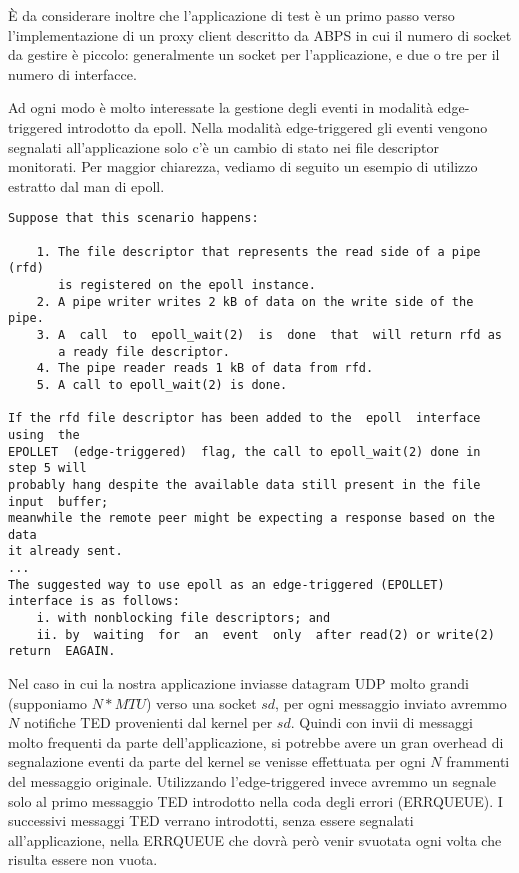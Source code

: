 \documentclass[a4paper,10pt]{article}
\begin{document}
È da considerare inoltre che l'applicazione di test 
è un primo passo verso l'implementazione di un proxy client descritto da
ABPS\cite{abps} in cui il numero di socket da gestire è piccolo:
generalmente un socket per l'applicazione, e due o tre per il numero di
interfacce.

Ad ogni modo è molto interessate la gestione degli eventi in modalità edge-triggered 
introdotto da epoll. Nella modalità edge-triggered gli eventi vengono
segnalati all'applicazione solo c'è un cambio di stato nei file
descriptor monitorati. Per maggior chiarezza, vediamo di seguito un esempio di utilizzo
estratto dal man di epoll.\\
\lstset{keywordstyle=,}
\begin{lstlisting}
Suppose that this scenario happens:

	1. The file descriptor that represents the read side of a pipe (rfd) 
	   is registered on the epoll instance.
	2. A pipe writer writes 2 kB of data on the write side of the pipe.
	3. A  call  to  epoll_wait(2)  is  done  that  will return rfd as
	   a ready file descriptor.
	4. The pipe reader reads 1 kB of data from rfd.
	5. A call to epoll_wait(2) is done.

If the rfd file descriptor has been added to the  epoll  interface  using  the
EPOLLET  (edge-triggered)  flag, the call to epoll_wait(2) done in step 5 will
probably hang despite the available data still present in the file input  buffer; 
meanwhile the remote peer might be expecting a response based on the data
it already sent.
...
The suggested way to use epoll as an edge-triggered (EPOLLET) interface is as follows:
	i. with nonblocking file descriptors; and
	ii. by  waiting  for  an  event  only  after read(2) or write(2) return  EAGAIN.
\end{lstlisting}

Nel caso in cui la nostra applicazione inviasse datagram UDP molto
grandi (supponiamo $N*MTU$) verso una socket $sd$, per ogni messaggio 
inviato avremmo $N$ notifiche TED provenienti dal kernel per $sd$. 
Quindi con invii di messaggi molto frequenti da parte
dell'applicazione, si potrebbe avere un gran overhead di segnalazione
eventi da parte del kernel se venisse effettuata per ogni $N$ frammenti
del messaggio originale. Utilizzando l'edge-triggered invece avremmo un
segnale solo al primo messaggio TED introdotto nella coda degli errori
(ERRQUEUE). I successivi messaggi TED verrano introdotti, senza essere
segnalati all'applicazione, nella ERRQUEUE che dovrà però venir svuotata ogni
volta che risulta essere non vuota.
\end{document}
